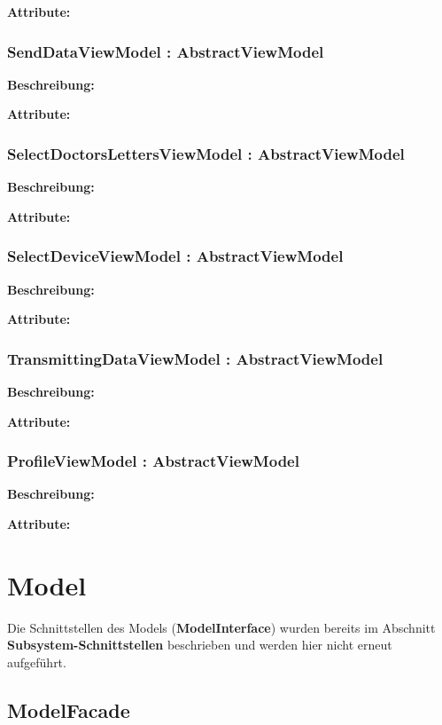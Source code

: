 \documentclass[a4paper]{scrreprt}
\begin{document}
\textbf{Attribute:}\\

\subsubsection{SendDataViewModel : AbstractViewModel}
\textbf{Beschreibung:}

\textbf{Attribute:}\\

\subsubsection{SelectDoctorsLettersViewModel : AbstractViewModel}
\textbf{Beschreibung:}

\textbf{Attribute:}\\

\subsubsection{SelectDeviceViewModel : AbstractViewModel}
\textbf{Beschreibung:}

\textbf{Attribute:}\\

\subsubsection{TransmittingDataViewModel : AbstractViewModel}
\textbf{Beschreibung:}

\textbf{Attribute:}\\

\subsubsection{ProfileViewModel : AbstractViewModel}
\textbf{Beschreibung:}

\textbf{Attribute:}\\



\section{Model}
Die Schnittstellen des Models (\textbf{ModelInterface}) wurden bereits im Abschnitt \textbf{Subsystem-Schnittstellen} beschrieben und werden hier nicht erneut aufgeführt.

\subsection{ModelFacade}
\end{document}
